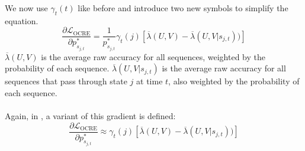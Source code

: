 We now use $\gamma_t(t)$ like before and introduce two new symbols to simplify the equation.
\[
\frac{\partial\mathcal{L}_{\text{OCRE}}}{\partial p^*_{s_{j,t}}} = \frac{1}{p^*_{s_{j,t}}} \gamma_t(j) \left[ \overline{\lambda}(U, V) - \overline{\lambda}(U, V|s_{j,t})) \right]
\]
$\overline{\lambda}(U, V)$ is the average raw accuracy for all sequences, weighted by the probability of each sequence. $\overline{\lambda}(U, V|s_{j,t})$ is the average raw accuracy for all sequences that pass through state $j$ at time $t$, also weighted by the probability of each sequence. \\ \\
Again, in \cite{ghoshal2013sequence}, a variant of this gradient is defined: 
\[
\frac{\partial\mathcal{L}_{\text{OCRE}}}{\partial p^*_{s_{j,t}}} \approx \gamma_t(j) \left[ \overline{\lambda}(U, V) - \overline{\lambda}(U, V|s_{j,t})) \right]
\]
